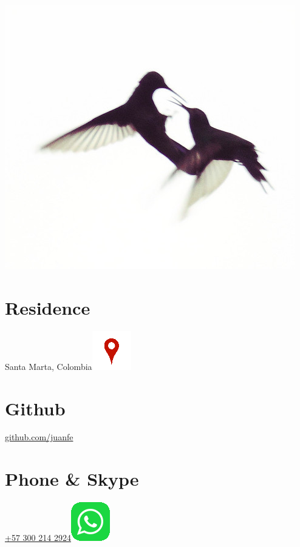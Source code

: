\begin{aside}
  \includegraphics[scale=0.28]{img/coruscan.jpg}
    ~
  \section{Residence}
    Santa Marta, Colombia\href{https://www.google.com/maps/place/Santa+Marta,+Magdalena/@11.2315666,-74.2030395,14}{\includegraphics[scale=0.15]{img/ubicacion.png}}
    ~
    ~
    ~
  \section{Github}
    \href{https://github.com/juanfe}{github.com/juanfe}
  \section{Phone \& Skype}
    \href{callto:+573002142924}{+57 300 214 2924\includegraphics[scale=0.15]{img/whatsapp.png}}
    ~
    ~
    ~
    ~

\end{aside}

